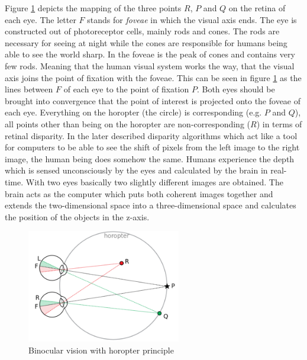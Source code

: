 \noindent Figure \ref{fig:horopter} depicts the mapping of the three points $R$, $P$ and $Q$ on the retina of each eye.
The letter $F$ stands for \textit{foveae} in which the visual axis ends.
The eye is constructed out of photoreceptor cells, mainly rods and cones.
The rods are necessary for seeing at night while the cones are responsible for humans being able to see the world sharp.
In the foveae is the peak of cones and contains very few rods.
Meaning that the human visual system works the way, that the visual axis joins the point of fixation with the foveae.
This can be seen in figure \ref{fig:horopter} as the lines between $F$ of each eye to the point of fixation $P$.
Both eyes should be brought into convergence that the point of interest is projected onto the foveae of each eye.
Everything on the horopter (the circle) is corresponding (e.g. $P$ and $Q$), all points other than being on the horopter are non-corresponding ($R$) in terms of retinal disparity.
\newline\newline\noindent In the later described disparity algorithms which act like a tool for computers to be able to see the shift of pixels from the left image to the right image, the human being does somehow the same.
Humans experience the depth which is sensed unconsciously by the eyes and calculated by the brain in real-time.
With two eyes basically two slightly different images are obtained.
The brain acts as the computer which puts both coherent images together and extends the two-dimensional space into a three-dimensional space and calculates the position of the objects in the z-axis.

\begin{figure}[h!]
  \centering
  \includegraphics[width=0.6\textwidth]{src/images/horopter.png}
  \caption[Binocular vision with horopter principle]{Binocular vision with horopter principle\protect\footnotemark}
  \label{fig:horopter}
\end{figure}

